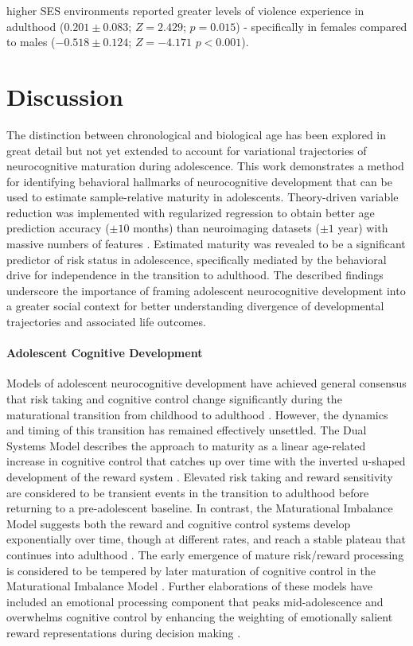\documentclass[utf8]{frontiersSCNS} %
\begin{document}
higher SES environments reported greater levels of violence experience in adulthood ($0.201\pm0.083$; $Z=2.429$; $p=0.015$) - specifically in females compared to males ($-0.518\pm0.124$;  $Z=-4.171$ $p<0.001$).
\\
\section{Discussion} The distinction between chronological and biological age has been explored in great detail but not yet extended to account for variational trajectories of neurocognitive maturation during adolescence. This work demonstrates a method for identifying behavioral hallmarks of neurocognitive development that can be used to estimate sample-relative maturity in adolescents. Theory-driven variable reduction was implemented with regularized regression to obtain better age prediction accuracy ($\pm 10$ months) than neuroimaging datasets ($\pm1$ year) with massive numbers of features \citep{cole2017predicting, franke2012brain}. Estimated maturity was revealed to be a significant predictor of risk status in adolescence, specifically mediated by the behavioral drive for independence in the transition to adulthood. The described findings underscore the importance of framing adolescent neurocognitive development into a greater social context for better understanding divergence of developmental trajectories and associated life outcomes.
\vspace{4pt}
\paragraph*{Adolescent Cognitive Development} Models of adolescent neurocognitive development have achieved general consensus that risk taking and cognitive control change significantly during the maturational transition from childhood to adulthood \citep{Steinberg2010}. However, the dynamics and timing of this transition has remained effectively unsettled. The Dual Systems Model describes the approach to maturity as a linear age-related increase in cognitive control that catches up over time with the inverted u-shaped development of the reward system \citep{Steinberg2005}. Elevated risk taking and reward sensitivity are considered to be transient events in the transition to adulthood before returning to a pre-adolescent baseline. In contrast, the Maturational Imbalance Model suggests both the reward and cognitive control systems develop exponentially over time, though at different rates, and reach a stable plateau that continues into adulthood \citep{CaseyEtAl2008}. The early emergence of mature risk/reward processing is considered to be tempered by later maturation of cognitive control in the Maturational Imbalance Model \citep{somerville2010developmental}. Further elaborations of these models have included an emotional processing component that peaks mid-adolescence and overwhelms cognitive control by enhancing the weighting of emotionally salient reward representations during decision making \citep{casey2019development}.
\vspace{4pt}
\end{document}
